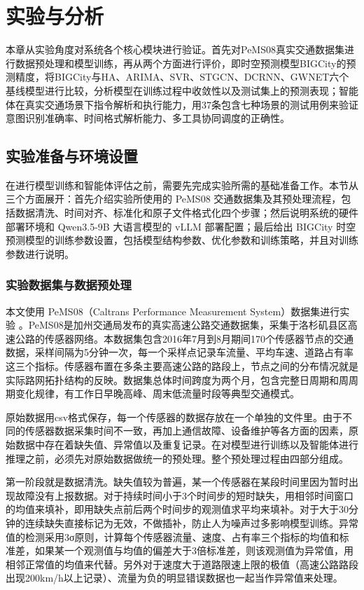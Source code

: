 \chapter{实验与分析}

本章从实验角度对系统各个核心模块进行验证。首先对PeMS08真实交通数据集进行数据预处理和模型训练，再从两个方面进行评价，即时空预测模型BIGCity的预测精度，将BIGCity与HA、ARIMA、SVR、STGCN、DCRNN、GWNET六个基线模型进行比较，分析模型在训练过程中收敛性以及测试集上的预测表现；智能体在真实交通场景下指令解析和执行能力，用37条包含七种场景的测试用例来验证意图识别准确率、时间格式解析能力、多工具协同调度的正确性。

\section{实验准备与环境设置}

在进行模型训练和智能体评估之前，需要先完成实验所需的基础准备工作。本节从三个方面展开：首先介绍实验所使用的 PeMS08 交通数据集及其预处理流程，包括数据清洗、时间对齐、标准化和原子文件格式化四个步骤；然后说明系统的硬件部署环境和 Qwen3.5-9B 大语言模型的 vLLM 部署配置；最后给出 BIGCity 时空预测模型的训练参数设置，包括模型结构参数、优化参数和训练策略，并且对训练参数进行说明。

\subsection{实验数据集与数据预处理}

本文使用 PeMS08（Caltrans Performance Measurement System）数据集进行实验 。PeMS08是加州交通局发布的真实高速公路交通数据集，采集于洛杉矶县区高速公路的传感器网络。本数据集包含2016年7月到8月期间170个传感器节点的交通数据，采样间隔为5分钟一次，每一个采样点记录车流量、平均车速、道路占有率这三个指标。传感器布置在多条主要高速公路的路段上，节点之间的分布情况就是实际路网拓扑结构的反映。数据集总体时间跨度为两个月，包含完整日周期和周周期变化规律，有工作日早晚高峰、周末低流量时段等典型交通模式。

原始数据用csv格式保存，每一个传感器的数据存放在一个单独的文件里。由于不同的传感器数据采集时间不一致，再加上通信故障、设备维护等各方面的因素，原始数据中存在着缺失值、异常值以及重复记录。在对模型进行训练以及智能体进行推理之前，必须先对原始数据做统一的预处理。整个预处理过程由四部分组成。

第一阶段就是数据清洗。缺失值较为普遍，某一个传感器在某段时间里因为暂时出现故障没有上报数据。对于持续时间小于3个时间步的短时缺失，用相邻时间窗口的均值来填补，即用缺失点前后两个时间步的观测值求平均来填补。对于大于30分钟的连续缺失直接标记为无效，不做插补，防止人为噪声过多影响模型训练。异常值的检测采用3σ原则，计算每个传感器流量、速度、占有率三个指标的均值和标准差，如果某一个观测值与均值的偏差大于3倍标准差，则该观测值为异常值，用相邻正常值的均值来代替。另外对于速度大于道路限速上限的极值（高速公路路段出现200km/h以上记录）、流量为负的明显错误数据也一起当作异常值来处理。

